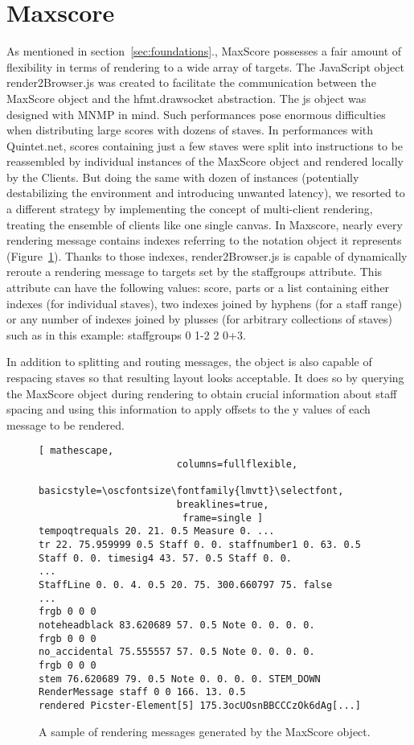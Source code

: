 \section{Maxscore}
As mentioned in section~\ref{sec:foundations}., MaxScore possesses a fair amount of flexibility in terms of rendering to a wide array of targets. The JavaScript object render2Browser.js was created to facilitate the communication between the MaxScore object and the hfmt.drawsocket abstraction. The js object was designed with MNMP in mind. Such performances pose enormous difficulties when distributing large scores with dozens of staves. In performances with Quintet.net, scores containing just a few staves were split into instructions to be reassembled by individual instances of the MaxScore object and rendered locally by the Clients. But doing the same with dozen of instances (potentially destabilizing the environment and introducing unwanted latency), we resorted to a different strategy by implementing the concept of multi-client rendering, treating the ensemble of clients like one single canvas. In Maxscore, nearly every rendering message contains indexes referring to the notation object it represents  (Figure~\ref{fig:maxscore-mesages}). Thanks to those indexes, render2Browser.js is capable of dynamically reroute a rendering message to targets set by the staffgroups attribute. This attribute can have the following values: score, parts or a list containing either indexes (for individual staves), two indexes joined by hyphens (for a staff range) or any number of indexes joined by plusses (for arbitrary collections of staves) such as in this example: staffgroups 0 1-2 2 0+3.

In addition to splitting and routing messages, the object is also capable of respacing staves so that resulting layout looks acceptable. It does so by querying the MaxScore object during rendering to obtain crucial information about staff spacing and using this information to apply offsets to the y values of each message to be rendered.




\begin{figure}[h]
\centering
\begin{lstlisting}[ mathescape,
						columns=fullflexible,
						basicstyle=\oscfontsize\fontfamily{lmvtt}\selectfont,
						breaklines=true,
						 frame=single ]
tempoqtrequals 20. 21. 0.5 Measure 0. ...
tr 22. 75.959999 0.5 Staff 0. 0. staffnumber1 0. 63. 0.5 Staff 0. 0. timesig4 43. 57. 0.5 Staff 0. 0.
...
StaffLine 0. 0. 4. 0.5 20. 75. 300.660797 75. false
...
frgb 0 0 0
noteheadblack 83.620689 57. 0.5 Note 0. 0. 0. 0.
frgb 0 0 0
no_accidental 75.555557 57. 0.5 Note 0. 0. 0. 0.
frgb 0 0 0
stem 76.620689 79. 0.5 Note 0. 0. 0. 0. STEM_DOWN
RenderMessage staff 0 0 166. 13. 0.5 
rendered Picster-Element[5] 175.3ocUOsnBBCCCzOk6dAg[...]
\end{lstlisting}

\caption{A sample of rendering messages generated by the MaxScore object. 
\label{fig:maxscore-mesages}}
\end{figure}

